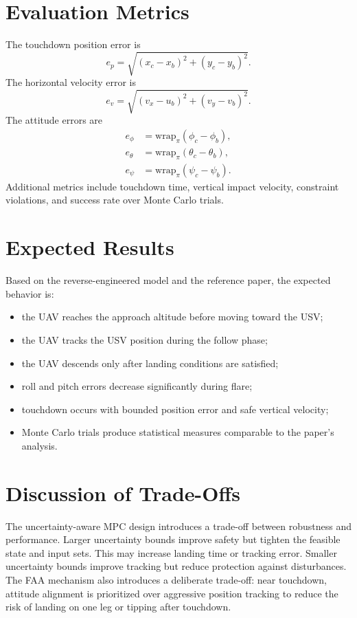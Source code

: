 \documentclass[12pt,a4paper]{report}
\begin{document}
\section{Evaluation Metrics}
The touchdown position error is
\begin{equation}
e_p=\sqrt{(x_c-x_b)^2+(y_c-y_b)^2}.
\end{equation}
The horizontal velocity error is
\begin{equation}
e_v=\sqrt{(v_x-u_b)^2+(v_y-v_b)^2}.
\end{equation}
The attitude errors are
\begin{align}
e_\phi&=\mathrm{wrap}_{\pi}(\phi_c-\phi_b),\\
e_\theta&=\mathrm{wrap}_{\pi}(\theta_c-\theta_b),\\
e_\psi&=\mathrm{wrap}_{\pi}(\psi_c-\psi_b).
\end{align}
Additional metrics include touchdown time, vertical impact velocity, constraint violations, and success rate over Monte Carlo trials.

\section{Expected Results}
Based on the reverse-engineered model and the reference paper, the expected behavior is:
\begin{itemize}
    \item the UAV reaches the approach altitude before moving toward the USV;
    \item the UAV tracks the USV position during the follow phase;
    \item the UAV descends only after landing conditions are satisfied;
    \item roll and pitch errors decrease significantly during flare;
    \item touchdown occurs with bounded position error and safe vertical velocity;
    \item Monte Carlo trials produce statistical measures comparable to the paper's analysis.
\end{itemize}

\section{Discussion of Trade-Offs}
The uncertainty-aware MPC design introduces a trade-off between robustness and performance. Larger uncertainty bounds improve safety but tighten the feasible state and input sets. This may increase landing time or tracking error. Smaller uncertainty bounds improve tracking but reduce protection against disturbances. The FAA mechanism also introduces a deliberate trade-off: near touchdown, attitude alignment is prioritized over aggressive position tracking to reduce the risk of landing on one leg or tipping after touchdown.
\end{document}
